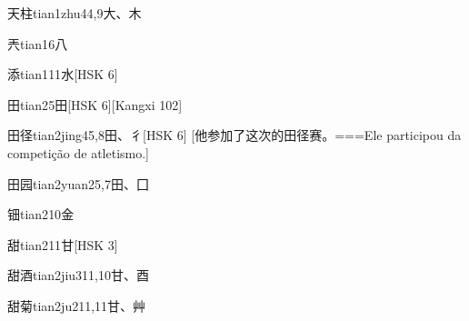 \begin{EntryWithPhonetic}{天柱}{tian1zhu4}{4,9}{⼤、⽊}
\end{EntryWithPhonetic}

\begin{EntryWithPhonetic}{兲}{tian1}{6}{⼋}
\end{EntryWithPhonetic}

\begin{EntryWithPhonetic}{添}{tian1}{11}{⽔}[HSK 6]
\end{EntryWithPhonetic}

\begin{EntryWithPhonetic}{田}{tian2}{5}{⽥}[HSK 6][Kangxi 102]
\end{EntryWithPhonetic}

\begin{EntryWithPhonetic}{田径}{tian2jing4}{5,8}{⽥、⼻}[HSK 6]
  [他参加了这次的田径赛。===Ele participou da competição de atletismo.]
\end{EntryWithPhonetic}

\begin{EntryWithPhonetic}{田园}{tian2yuan2}{5,7}{⽥、⼞}
\end{EntryWithPhonetic}

\begin{EntryWithPhonetic}{钿}{tian2}{10}{⾦}
\end{EntryWithPhonetic}

\begin{EntryWithPhonetic}{甜}{tian2}{11}{⽢}[HSK 3]
\end{EntryWithPhonetic}

\begin{EntryWithPhonetic}{甜酒}{tian2jiu3}{11,10}{⽢、⾣}
\end{EntryWithPhonetic}

\begin{EntryWithPhonetic}{甜菊}{tian2ju2}{11,11}{⽢、⾋}
\end{EntryWithPhonetic}

